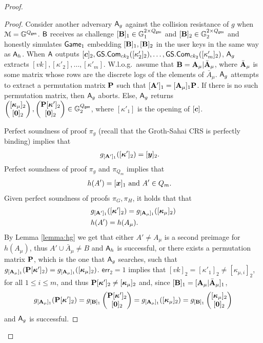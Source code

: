 \begin{proof}
\begin{proof}
Consider another adversary $\mathsf{A}_g$ against the collision resistance of $g$ when $\mathcal{M}=\mathbb{G}^{Q_\mathsf{gen}}$. $\mathsf{B}$ receives as challenge $[\mathbf{{B}}]_1\in\mathbb{G}^{2\times {Q_\mathsf{gen}}}_1$ and $[\mathbf{{B}}]_2\in\mathbb{G}^{2\times {Q_\mathsf{gen}}}_2$ and honestly simulates $\mathsf{Game}_1$ embedding $[\mathbf{{B}}]_1,[\mathbf{{B}}]_2$ in the user keys in the same way as $\mathsf{A}_h$. When $\mathsf{A}$ outputs $[{\boldsymbol{c}}]_2,\allowbreak{\mathsf{GS}}.\mathsf{Com}_{ck_2}([\kappa'_2]_2),\ldots,\allowbreak{\mathsf{GS}}.\mathsf{Com}_{ck_2}([\kappa'_m]_2)$, $\mathsf{A}_g$ extracts $[vk],[\kappa'_2],\ldots,[\kappa'_m]$. W.l.o.g.~\allowbreak assume that $\mathbf{{B}}=\mathbf{{A}}_\mu|\bar{\mathbf{{A}}}_\mu$, where $\bar{\mathbf{{A}}}_\mu$ is some matrix whose rows are the discrete logs of the elements of $\bar{A}_\mu$. $\mathsf{A}_g$ attempts to extract a permutation matrix $\mathbf{{P}}$ such that  $[\mathbf{{A}}']_1=[\mathbf{{A}}_\mu]_1\mathbf{{P}}$. If there is no such permutation matrix, then $\mathsf{A}_g$ aborts. Else,  $\mathsf{A}_g$ returns
$\left(\begin{matrix}
	{[{\boldsymbol{\kappa}}_\mu]_2}\\
	{[{\boldsymbol{0}}]_2}\end{matrix}\right),
\left(\begin{matrix}
	{\mathbf{{P}}[{\boldsymbol{\kappa}}']_2}\\
	{[{\boldsymbol{0}}]_2}\end{matrix}\right)
\in\mathbb{G}^{Q_\mathsf{gen}}_2$,
where $[\kappa'_1]$ is the opening of $[{\boldsymbol{c}}]$.

Perfect soundness of proof $\pi_g$  (recall that the Groth-Sahai CRS is perfectly binding)  implies that
\begin{align*}
&g_{[\matr{A}']_1}([\vecb{\kappa}']_2)=[\vecb{y}]_2. %
\end{align*}
Perfect soundness of proof $\pi_g$ and $\pi_{Q_m}$ implies that
\begin{align*}
&h(A')=[\vecb{x}]_1\text{ and } A'\in Q_m.%
\end{align*}
Given perfect soundness of proofs $\pi_G,\pi_H$, it holds that that
\begin{align*}
&g_{[\matr{A}']_1}([\vecb{\kappa}']_2)=g_{[\matr{A}_\mu]_1}([\vecb{\kappa}_\mu]_2)%
\\
&h(A')=h(A_\mu). %
\end{align*}
By Lemma \ref{lemma:hg} we get that either $A'\neq {A}_\mu$ is a second preimage for $h(A_\mu)$, thus $A'\cup\bar{A}_\mu\neq B$ and $\mathsf{A}_h$ is successful, or there exists a permutation matrix $\mathbf{{P}}$, which is the one that $\mathsf{A}_g$ searches, such that $g_{[\mathbf{{A}}_\mu]_1}(\mathbf{{P}}[{\boldsymbol{\kappa}}']_2)=g_{[\mathbf{{A}}_\mu]_1}([{\boldsymbol{\kappa}}_\mu]_2)$. $\mathsf{err}_2=1$ implies that $[vk]_2=[\kappa'_1]_2\neq[\kappa_{\mu,i}]_2$, for all $1\leq i\leq m$, and thus $\mathbf{{P}}[{\boldsymbol{\kappa}}']_2\neq [{\boldsymbol{\kappa}}_\mu]_2$ and, since $[\mathbf{{B}}]_1=[\mathbf{{A}}_\mu|\bar{\mathbf{{A}}}_\mu]_1$,
$$
g_{[\mathbf{{A}}_\mu]_1}(\mathbf{{P}}[{\boldsymbol{\kappa}}']_2)=
g_{[\mathbf{{B}}]_1}\left(\begin{matrix}
	{\mathbf{{P}}[{\boldsymbol{\kappa}}']_2}\\
	{[{\boldsymbol{0}}]_2}\end{matrix}\right)
=
g_{[\mathbf{{A}}_\mu]_1}([{\boldsymbol{\kappa}}_\mu]_2)
=
g_{[\mathbf{{B}}]_1}\left(\begin{matrix}
	{[{\boldsymbol{\kappa}}_\mu]_2}\\
	{[{\boldsymbol{0}}]_2}\end{matrix}\right)
$$ 
and $\mathsf{A}_g$ is successful.


\end{proof}
\end{proof}
